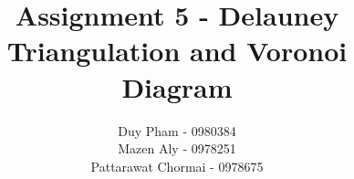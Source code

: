 \documentclass{article}
\begin{document}
\title{Assignment 5 - Delauney Triangulation and Voronoi Diagram }
\author{
	Duy Pham - 0980384 \\
	Mazen Aly - 0978251 \\
	Pattarawat Chormai - 0978675 \\
}
\maketitle


%
\end{document}

